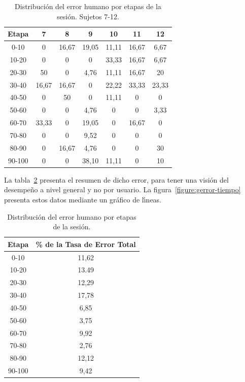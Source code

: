 \begin{table}[H]
\centering
\footnotesize
\begin{tabular}{|c|c|c|c|c|c|c|}
\hline
    Etapa & 7 & 8 & 9 & 10 & 11 & 12 \\
\hline
0-10    &  0        &  16,67 &  19,05 &  11,11 &  16,67 &  6,67 \\
10-20   &  0        &  0       &  0       &  33,33 &  16,67 &  6,67 \\
20-30   &  50       &  0       &  4,76  &  11,11 &  16,67 &  20 \\
30-40   &  16,67  &  16,67 &  0       &  22,22 &  33,33 &  23,33 \\
40-50   &  0        &  50      &  0       &  11,11 &  0       &  0 \\
50-60   &  0        &  0       &  4,76  &  0       &  0       &  3,33 \\
60-70   &  33,33  &  0       &  19,05 &  0       &  16,67 &  0 \\
70-80   &  0        &  0       &  9,52  &  0       &  0       &  0 \\
80-90   &  0        &  16,67 &  4,76  &  0       &  0       &  30 \\
90-100  &  0        &  0       &  38,10 &  11,11 &  0       &  10 \\
\hline
\end{tabular}
\caption{Distribuci\'on del error humano por etapas de la sesi\'on. Sujetos 7-12.}
\label{sec:error-tiempo-2}
\end{table}

La tabla~\ref{sec:error-tiempo} presenta el resumen de dicho error, para tener una visi\'on del desempe\~no a nivel
general y no por usuario. La figura~\ref{figure:gerror-tiempo} presenta estos datos mediante un gr\'afico 
de l{\'\i}neas.


\begin{table}[H]
\centering
\footnotesize
\begin{tabular}{|c|c|}
\hline
    Etapa & \% de la Tasa de Error Total \\
    \hline
0-10  &  11,62 \\
10-20 &  13.49 \\
20-30 &  12,29 \\
30-40 &  17,78 \\
40-50 &  6,85 \\
50-60 &  3,75 \\
60-70 &  9,92 \\
70-80 &  2,76 \\
80-90 &  12,12 \\
90-100 & 9,42 \\
    \hline
\end{tabular}
\caption{Distribuci\'on del error humano por etapas de la sesi\'on.}
\label{sec:error-tiempo}
\end{table}

